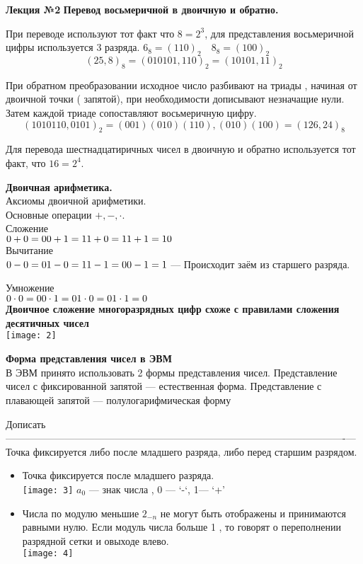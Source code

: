 \LARGE{ \textbf {Лекция №2}}
\Large{ \textbf {Перевод восьмеричной в двоичную и обратно.}}

При переводе используют тот факт что $ 8 = 2^3$, для представления восьмеричной цифры используется 3 разряда.
$6_8 = (110)_2 \quad
8_8 = (100)_2 $
$$ (25,8)_8 = (010101,110)_2 = (10101,11)_2 $$


При обратном преобразовании исходное число разбивают на триады , начиная от двоичной точки ( запятой), при необходимости дописывают незначащие нули.
Затем каждой триаде сопоставляют восьмеричную цифру.
$$ (1010110,0101)_2 = (001)(010)(110),(010)(100) = (126,24)_8     $$

Для перевода шестнадцатиричных чисел в двоичную и обратно используется тот факт, что
$ 16 = 2^4 $.

\Large{ \textbf {Двоичная арифметика.}} \\
Аксиомы двоичной арифметики.\\
Основные операции $ +, -, \cdot .$\\
Сложение\\
$0+0=0\\
0+1=1\\
1+0=1\\
1+1= 10$\\
Вычитание\\
$0-0=0\\
1-0=1\\
1-1=0\\
0-1= 1$ — Происходит заём из старшего разряда.

Умножение\\
$0 \cdot 0=0\\
0 \cdot 1=0\\
1 \cdot 0=0\\
1 \cdot 1=0$\\
\newpage
\Large{ \textbf {Двоичное сложение многоразрядных цифр схоже с правилами сложения десятичных чисел}}\\
\texttt{[image: 2]}


\Large{ \textbf { Форма представления чисел в ЭВМ}}\\
В ЭВМ принято использовать 2 формы представления чисел.
Представление чисел с фиксированной запятой — естественная форма.
Представление с плавающей запятой — полулогарифмическая форму


Дописать —————————————————----------------------------------------------------—\\
Точка фиксируется либо после младшего разряда, либо перед старшим разрядом.\\
\begin{itemize}
  \item{ Точка фиксируется после младшего разряда.\\
  \texttt{[image: 3]}
  $a_0$ — знак числа , 0 — ‘-‘, 1— ‘+’
  }
  \item{Числа по модулю меньшие $ 2_{-n} $ не могут быть отображены и принимаются равными нулю.
Если модуль числа больше 1 , то говорят о переполнении разрядной сетки и овыходе влево.\\
  \texttt{[image: 4]}
}
\end{itemize}

